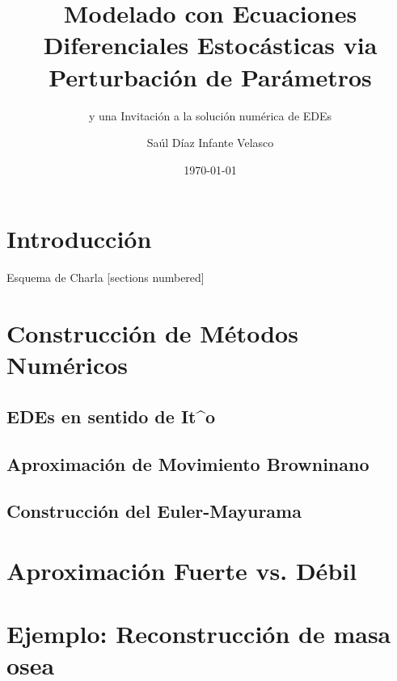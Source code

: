 \documentclass[10pt]{beamer}
\title{Modelado con Ecuaciones Diferenciales 
    Estoc\'asticas via Perturbaci\'on de Par\'ametros}
\subtitle{y una Invitaci\'on a la soluci\'on num\'erica de EDEs}
\date{\today}
\author{Sa\'ul D\'iaz Infante Velasco}
\institute{CONACYT-Universidad de Sonora}
\begin{document}
    \maketitle
    \section*{Introducci\'on}
        
    \begin{frame}{Esquema de Charla}
        [sections numbered]
        \tableofcontents[hideallsubsections]
    \end{frame}
    \section{Construcción de Métodos Numéricos}
        \subsection{EDEs en sentido de It^o}
            
            
        \subsection{Aproximaci\'on de Movimiento Browninano}
            
        \subsection{Construcci\'on del Euler-Mayurama}
        \section{Aproximaci\'on Fuerte vs. D\'ebil}
            
    \section{Ejemplo: Reconstrucción de masa osea}
        
        
        
        
        
        
        
\end{document}
